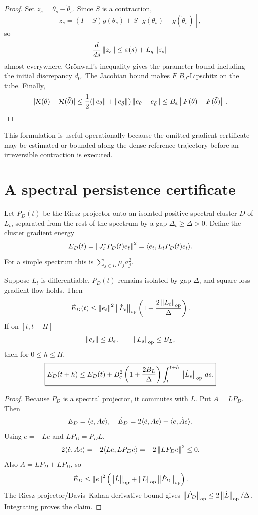 \begin{proof}
Set $z_s=\theta_s-\widetilde\theta_s$. Since $S$ is a contraction,
\[
\dot z_s
=(I-S)g(\theta_s)+S[g(\theta_s)-g(\widetilde\theta_s)],
\]
so
\[
\frac{d}{ds}\left\lVert z_s\right\rVert
\le\varepsilon(s)+L_g\left\lVert z_s\right\rVert
\]
almost everywhere. Gr\"onwall's inequality gives the parameter bound including the initial discrepancy $d_0$. The Jacobian bound makes $F$ $B_J$-Lipschitz on the tube. Finally,
\[
|\mathcal R(\theta)-\mathcal R(\tilde\theta)|
\le\frac12(\left\lVert e_\theta\right\rVert+\left\lVert e_{\tilde\theta}\right\rVert)
\left\lVert e_\theta-e_{\tilde\theta}\right\rVert
\le B_e\left\lVert F(\theta)-F(\tilde\theta)\right\rVert.
\]
\end{proof}

This formulation is useful operationally because the omitted-gradient certificate may be estimated or bounded along the dense reference trajectory before an irreversible contraction is executed.

\section{A spectral persistence certificate}
Let $P_D(t)$ be the Riesz projector onto an isolated positive spectral cluster $D$ of $L_t$, separated from the rest of the spectrum by a gap $\Delta_t\ge\Delta>0$. Define the cluster gradient energy
\[
E_D(t)=\left\lVert J_t^\ast P_D(t)e_t\right\rVert^2
=\langle e_t,L_tP_D(t)e_t\rangle.
\]
For a simple spectrum this is $\sum_{j\in D}\mu_j a_j^2$.

\begin{theorem}\label{thm:persistence}
Suppose $L_t$ is differentiable, $P_D(t)$ remains isolated by gap $\Delta$, and square-loss gradient flow holds. Then
\[
\dot E_D(t)
\le
\left\lVert e_t\right\rVert^2\left\lVert \dot L_t\right\rVert_{\mathrm{op}}
\left(1+\frac{2\left\lVert L_t\right\rVert_{\mathrm{op}}}{\Delta}\right).
\]
If on $[t,t+H]$
\[
\left\lVert e_s\right\rVert\le B_e,
\qquad
\left\lVert L_s\right\rVert_{\mathrm{op}}\le B_L,
\]
then for $0\le h\le H$,
\[
\boxed{
E_D(t+h)
\le E_D(t)
+B_e^2\left(1+\frac{2B_L}{\Delta}\right)
\int_t^{t+h}\left\lVert \dot L_s\right\rVert_{\mathrm{op}}\,ds.}
\]
\end{theorem}

\begin{proof}
Because $P_D$ is a spectral projector, it commutes with $L$. Put $A=LP_D$. Then
\[
E_D=\langle e,Ae\rangle,
\quad
\dot E_D=2\langle \dot e,Ae\rangle+\langle e,\dot A e\rangle.
\]
Using $\dot e=-Le$ and $LP_D=P_DL$,
\[
2\langle \dot e,Ae\rangle
=-2\langle Le,LP_De\rangle
=-2\left\lVert LP_De\right\rVert^2\le0.
\]
Also $\dot A=\dot L P_D+L\dot P_D$, so
\[
\dot E_D\le\left\lVert e\right\rVert^2
\left(\left\lVert \dot L\right\rVert_{\mathrm{op}}+\left\lVert L\right\rVert_{\mathrm{op}}\left\lVert \dot P_D\right\rVert_{\mathrm{op}}\right).
\]
The Riesz-projector/Davis--Kahan derivative bound gives
$\left\lVert \dot P_D\right\rVert_{\mathrm{op}}\le2\left\lVert \dot L\right\rVert_{\mathrm{op}}/\Delta$. Integrating proves the claim.
\end{proof}

